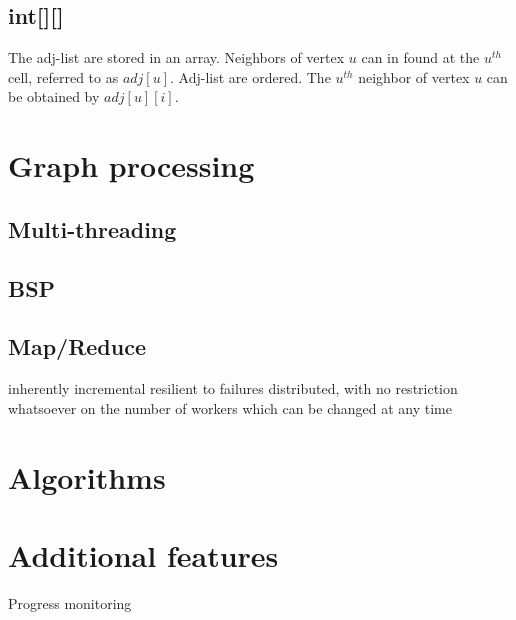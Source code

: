 \documentclass[11pt,a4paper]{article}
\begin{document}
\subsection{int[][]}

The adj-list are stored in an array. Neighbors of vertex $u$ can in found at the $u^{th}$ cell, referred to as $adj[u]$.
Adj-list are ordered. The $u^{th}$ neighbor of vertex $u$ can be obtained by $adj[u][i]$.

\section{Graph processing}
\subsection{Multi-threading}

\subsection{BSP}


\subsection{Map/Reduce}
inherently
incremental
resilient to failures
distributed, with no restriction whatsoever on the number of workers which can be changed at any time

\section{Algorithms}



\section{Additional features}

Progress monitoring
\end{document}

